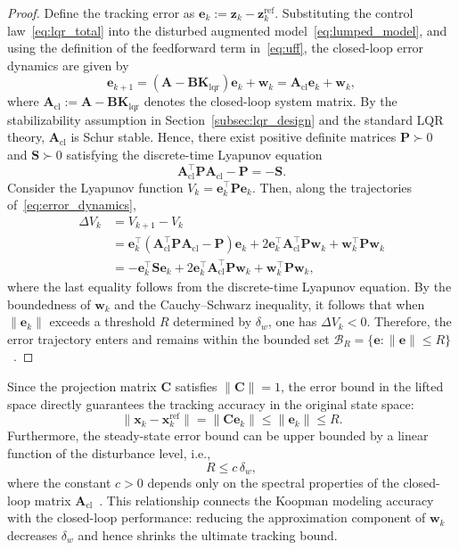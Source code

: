 \documentclass[final,3p,twocolumn,times]{elsarticle}
\newcommand{\x}{\mathbf{x}}
\newcommand{\z}{\mathbf{z}}
\newcommand{\w}{\mathbf{w}}
\newcommand{\e}{\mathbf{e}}
\newcommand{\Kmat}{\mathbf{K}}
\newcommand{\A}{\mathbf{A}}
\newcommand{\B}{\mathbf{B}}
\newcommand{\C}{\mathbf{C}}
\begin{document}
\begin{proof}
Define the tracking error as $\e_k := \z_k - \z_k^{\text{ref}}$. Substituting the control law~\eqref{eq:lqr_total} into the disturbed augmented model~\eqref{eq:lumped_model}, and using the definition of the feedforward term in~\eqref{eq:uff}, the closed-loop error dynamics are given by
\begin{equation}
\label{eq:error_dynamics}
\e_{k+1} = (\A - \B\Kmat_{\text{lqr}})\e_k + \w_k = \A_{\text{cl}}\e_k + \w_k,
\end{equation}
where $\A_{\text{cl}} := \A - \B\Kmat_{\text{lqr}}$ denotes the closed-loop system matrix. By the stabilizability assumption in Section~\ref{subsec:lqr_design} and the standard LQR theory, $\A_{\text{cl}}$ is Schur stable. Hence, there exist positive definite matrices $\mathbf{P} \succ 0$ and $\mathbf{S} \succ 0$ satisfying the discrete-time Lyapunov equation
\[
\A_{\text{cl}}^\top \mathbf{P} \A_{\text{cl}} - \mathbf{P} = -\mathbf{S}.
\]
Consider the Lyapunov function $V_k = \e_k^\top \mathbf{P} \e_k$. Then, along the trajectories of~\eqref{eq:error_dynamics},
\begin{align}
\Delta V_k &= V_{k+1} - V_k \nonumber \\
&= \e_k^\top (\A_{\text{cl}}^\top \mathbf{P} \A_{\text{cl}} - \mathbf{P}) \e_k
+ 2\e_k^\top \A_{\text{cl}}^\top \mathbf{P}\w_k
+ \w_k^\top \mathbf{P}\w_k \nonumber \\
&= -\e_k^\top \mathbf{S} \e_k
+ 2\e_k^\top \A_{\text{cl}}^\top \mathbf{P}\w_k
+ \w_k^\top \mathbf{P}\w_k,
\end{align}
where the last equality follows from the discrete-time Lyapunov equation. By the boundedness of $\w_k$ and the Cauchy--Schwarz inequality, it follows that when $\|\e_k\|$ exceeds a threshold $R$ determined by $\delta_w$, one has $\Delta V_k < 0$. Therefore, the error trajectory enters and remains within the bounded set $\mathcal{B}_R = \{\e : \|\e\| \le R\}$~\cite{Blanchini2008,Khalil2002}.
\end{proof}

Since the projection matrix $\C$ satisfies $\|\C\| = 1$, the error bound in the lifted space directly guarantees the tracking accuracy in the original state space:
\[
\|\x_k - \x_k^{\text{ref}}\| = \|\C\e_k\| \le \|\e_k\| \le R.
\]
Furthermore, the steady-state error bound can be upper bounded by a linear function of the disturbance level, i.e.,
\[
R \le c\,\delta_w,
\]
where the constant $c > 0$ depends only on the spectral properties of the closed-loop matrix $\A_{\text{cl}}$~\cite{Blanchini2008}. This relationship connects the Koopman modeling accuracy with the closed-loop performance: reducing the approximation component of $\w_k$ decreases $\delta_w$ and hence shrinks the ultimate tracking bound.
\end{document}
